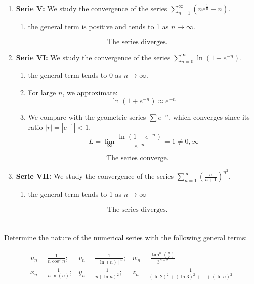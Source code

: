 \documentclass[12pt]{article}
\begin{document}
\begin{correctionbox}
\begin{enumerate}
    \item \textbf{Serie V:} We study the convergence of the series $\sum_{n=1}^{\infty} \left( ne^{\frac{1}{n}} - n \right)$.
    \begin{enumerate}
        \item the general term is positive and tends to 1 as $n \to \infty$.
    \end{enumerate}
    \[\boxed{\text{The series diverges.}}\]

    \item \textbf{Serie VI:} We study the convergence of the series $\sum_{n=0}^{\infty} \ln\left(1 + e^{-n}\right)$.
    \begin{enumerate}
        \item the general term tends to 0 as $n \to \infty$.
        \item For large $n$, we approximate:
    \[\ln\left(1 + e^{-n}\right) \approx e^{-n}\]
        \item We compare with the geometric series $\sum e^{-n}$, which converges since its ratio $|r| = |e^{-1}| < 1$.
    \[L = \lim_{\infty} \frac{\ln\left(1 + e^{-n}\right)}{e^{-n}} = 1 \neq 0, \infty \]
    \end{enumerate}
    \[\boxed{\text{The series converge.}}\]

    \item \textbf{Serie VII:} We study the convergence of the series $\sum_{n=1}^{\infty} \left( \frac{n}{n + 1} \right)^{n^2}$.
    \begin{enumerate}
        \item the general term tends to 1 as $n \to \infty$
    \end{enumerate}
    \[\boxed{\text{The series diverges.}}\]

\end{enumerate}
\end{correctionbox}

\section{}
Determine the nature of the numerical series with the following general terms:

\[
\begin{array}{lll}
\displaystyle  u_n = \frac{1}{n \cos^2 n};  &
\displaystyle  v_n = \frac{1}{[\ln(n)]^n};  &
\displaystyle  w_n = \frac{\tan^n\left(\frac{\pi}{7}\right)}{3^{n+2}}  \\[1.5em]
\displaystyle  x_n = \frac{1}{n \ln(n)}; &
\displaystyle  y_n = \frac{1}{n(\ln n)^2}; &
\displaystyle  z_n = \frac{1}{(\ln 2)^2 + (\ln 3)^2 + \ldots + (\ln n)^2} 
\end{array}
\]
\end{document}
